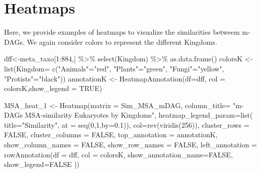 \documentclass[
  letterpaper,
  DIV=11,
  numbers=noendperiod]{scrreprt}
\newenvironment{Shaded}{}{}
\newcommand{\AttributeTok}[1]{\textcolor[rgb]{0.78,0.47,0.87}{#1}}
\newcommand{\ConstantTok}[1]{\textcolor[rgb]{0.82,0.60,0.40}{#1}}
\newcommand{\DecValTok}[1]{\textcolor[rgb]{0.82,0.60,0.40}{#1}}
\newcommand{\FloatTok}[1]{\textcolor[rgb]{0.82,0.60,0.40}{#1}}
\newcommand{\FunctionTok}[1]{\textcolor[rgb]{0.38,0.69,0.94}{#1}}
\newcommand{\NormalTok}[1]{\textcolor[rgb]{0.67,0.70,0.75}{#1}}
\newcommand{\OtherTok}[1]{\textcolor[rgb]{0.15,0.68,0.38}{#1}}
\newcommand{\SpecialCharTok}[1]{\textcolor[rgb]{0.34,0.71,0.76}{#1}}
\newcommand{\StringTok}[1]{\textcolor[rgb]{0.60,0.76,0.47}{#1}}
\begin{document}
\hypertarget{heatmaps}{%
\section{Heatmaps}\label{heatmaps}}

Here, we provide examples of heatmaps to visualize the similarities
betweem m-DAGs. We again consider colors to represent the different
Kingdoms.

\begin{Shaded}
\begin{Highlighting}[]
\NormalTok{dff}\OtherTok{\textless{}{-}}\NormalTok{meta\_taxo[}\DecValTok{1}\SpecialCharTok{:}\DecValTok{884}\NormalTok{,] }\SpecialCharTok{\%\textgreater{}\%} \FunctionTok{select}\NormalTok{(Kingdom)  }\SpecialCharTok{\%\textgreater{}\%} \FunctionTok{as.data.frame}\NormalTok{()}
\NormalTok{colorsK }\OtherTok{\textless{}{-}} \FunctionTok{list}\NormalTok{(}\AttributeTok{Kingdom=} \FunctionTok{c}\NormalTok{(}\StringTok{"Animals"}\OtherTok{=}\StringTok{"red"}\NormalTok{,}
                           \StringTok{"Plants"}\OtherTok{=}\StringTok{"green"}\NormalTok{,}
                           \StringTok{"Fungi"}\OtherTok{=}\StringTok{"yellow"}\NormalTok{,}
                           \StringTok{"Protists"}\OtherTok{=}\StringTok{"black"}\NormalTok{))}
\NormalTok{annotationK }\OtherTok{\textless{}{-}} \FunctionTok{HeatmapAnnotation}\NormalTok{(}\AttributeTok{df=}\NormalTok{dff, }\AttributeTok{col =}\NormalTok{ colorsK,}\AttributeTok{show\_legend =} \ConstantTok{TRUE}\NormalTok{)}

\NormalTok{MSA\_heat\_1 }\OtherTok{\textless{}{-}} \FunctionTok{Heatmap}\NormalTok{(}\AttributeTok{matrix =}\NormalTok{ Sim\_MSA\_mDAG, }
                      \AttributeTok{column\_title=}
                        \StringTok{"m{-}DAGs MSA{-}similarity Eukaryotes by Kingdoms"}\NormalTok{,}
                      \AttributeTok{heatmap\_legend\_param=}\FunctionTok{list}\NormalTok{(}
                        \AttributeTok{title=}\StringTok{"Similarity"}\NormalTok{,}
                        \AttributeTok{at =} \FunctionTok{seq}\NormalTok{(}\DecValTok{0}\NormalTok{,}\DecValTok{1}\NormalTok{,}\AttributeTok{by=}\FloatTok{0.1}\NormalTok{)),}
                      \AttributeTok{col=}\FunctionTok{rev}\NormalTok{(}\FunctionTok{viridis}\NormalTok{(}\DecValTok{256}\NormalTok{)),}
                      \AttributeTok{cluster\_rows =} \ConstantTok{FALSE}\NormalTok{,}
                      \AttributeTok{cluster\_columns =} \ConstantTok{FALSE}\NormalTok{,}
                      \AttributeTok{top\_annotation =}\NormalTok{ annotationK,}
                      \AttributeTok{show\_column\_names =} \ConstantTok{FALSE}\NormalTok{, }
                      \AttributeTok{show\_row\_names =} \ConstantTok{FALSE}\NormalTok{,}
                      \AttributeTok{left\_annotation =}
                        \FunctionTok{rowAnnotation}\NormalTok{(}\AttributeTok{df =}\NormalTok{ dff,}
                                      \AttributeTok{col =}\NormalTok{ colorsK,}
                                    \AttributeTok{show\_annotation\_name=}\ConstantTok{FALSE}\NormalTok{,}
                                    \AttributeTok{show\_legend=}\ConstantTok{FALSE}
\NormalTok{                                      ))}



\end{Highlighting}
\end{Shaded}
\end{document}
